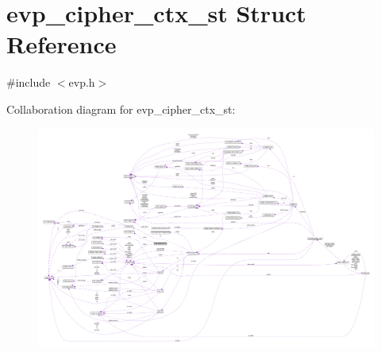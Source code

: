 \hypertarget{structevp__cipher__ctx__st}{}\section{evp\+\_\+cipher\+\_\+ctx\+\_\+st Struct Reference}
\label{structevp__cipher__ctx__st}


{\ttfamily \#include $<$evp.\+h$>$}



Collaboration diagram for evp\+\_\+cipher\+\_\+ctx\+\_\+st\+:\nopagebreak
\begin{figure}[H]
\begin{center}
\leavevmode
\includegraphics[width=350pt]{structevp__cipher__ctx__st__coll__graph}
\end{center}
\end{figure}
